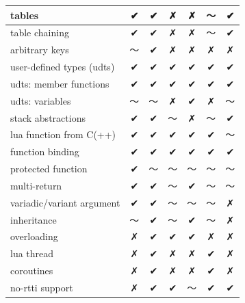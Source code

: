 \documentclass[conference,compsoc]{IEEEtran}
\begin{document}
\begin{table}[ht!]
\begin{tabular}{l c c c c c c }
		\\ \hline
		tables                    &        ✔       &     ✔    &     ✗    &     ✗     &        〜        &    ✔
		\\ \hline
		table chaining            &        ✔       &     ✔    &     ✗    &     ✗     &        〜        &    ✔
		\\ \hline
		arbitrary keys            &        〜       &     ✔    &     ✗    &     ✗     &        ✗        &    ✗
		\\ \hline
		user-defined types (udts) &        ✔       &     ✔    &     ✔    &     ✔     &        ✔        &    ✔
		\\ \hline
		udts: member functions    &        ✔       &     ✔    &     ✔    &     ✔     &        ✔        &    ✔
		\\ \hline
		udts: variables           &        〜       &     〜    &     ✗    &     ✔     &        ✗        &    〜
		\\ \hline
		stack abstractions        &        ✔       &     ✔    &     〜    &     ✗     &        〜        &    ✔
		\\ \hline
		lua function from C(++)   &        ✔       &     ✔    &     ✔    &     ✔     &        ✔        &    〜
		\\ \hline
		function binding          &        ✔       &     ✔    &     ✔    &     ✔     &        ✔        &    ✔
		\\ \hline
		protected function        &        ✔       &     〜    &     〜    &     〜     &        〜        &    〜
		\\ \hline
		multi-return              &        ✔       &     ✔    &     〜    &     ✔     &        〜        &    〜
		\\ \hline
		variadic/variant argument &        ✔       &     ✔    &     〜    &     〜     &        〜        &    ✗
		\\ \hline
		inheritance               &        〜       &     ✔    &     〜    &     ✔     &        〜        &    ✗
		\\ \hline
		overloading               &        ✗       &     ✔    &     ✔    &     ✔     &        ✗        &    ✗
		\\ \hline
		lua thread                &        ✗       &     ✔    &     ✗    &     ✗     &        ✔        &    ✗
		\\ \hline
		coroutines                &        ✗       &     ✔    &     ✗    &     ✗     &        ✔        &    ✗
		\\ \hline
		no-rtti support           &        ✗       &     ✔    &     ✔    &     〜     &        ✔        &    ✔

\end{tabular}
\end{table}
\end{document}
